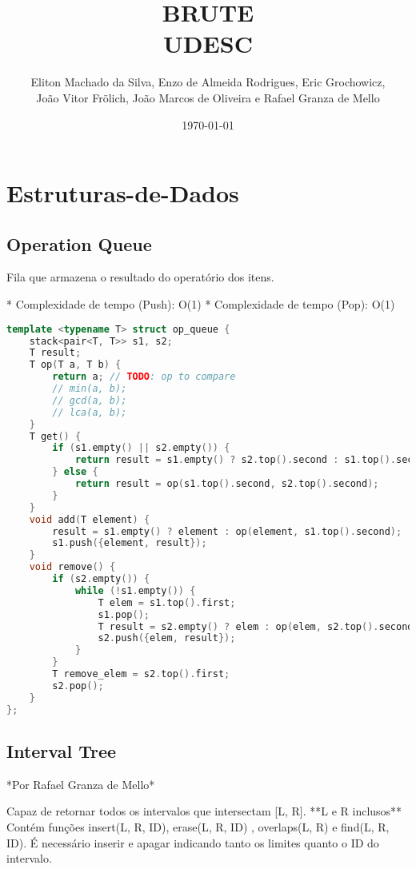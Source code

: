 \documentclass[11pt, a4paper, twoside]{article}
\title{BRUTE \\ UDESC}
\author{Eliton Machado da Silva, Enzo de Almeida Rodrigues, Eric Grochowicz, \\ João Vitor Frölich, João Marcos de Oliveira e Rafael Granza de Mello}
\begin{document}
\date{\today}
\maketitle


\renewcommand{\contentsname}{Índice} %
\tableofcontents
\newpage
%
%
%
%

\section{Estruturas-de-Dados}

\subsection{Operation Queue}



Fila que armazena o resultado do operatório dos itens.

* Complexidade de tempo (Push): O(1)
* Complexidade de tempo (Pop): O(1)

\begin{lstlisting}[language=C++]
template <typename T> struct op_queue {
    stack<pair<T, T>> s1, s2;
    T result;
    T op(T a, T b) {
        return a; // TODO: op to compare
        // min(a, b);
        // gcd(a, b);
        // lca(a, b);
    }
    T get() {
        if (s1.empty() || s2.empty()) {
            return result = s1.empty() ? s2.top().second : s1.top().second;
        } else {
            return result = op(s1.top().second, s2.top().second);
        }
    }
    void add(T element) {
        result = s1.empty() ? element : op(element, s1.top().second);
        s1.push({element, result});
    }
    void remove() {
        if (s2.empty()) {
            while (!s1.empty()) {
                T elem = s1.top().first;
                s1.pop();
                T result = s2.empty() ? elem : op(elem, s2.top().second);
                s2.push({elem, result});
            }
        }
        T remove_elem = s2.top().first;
        s2.pop();
    }
};
\end{lstlisting}


\subsection{Interval Tree}

*Por Rafael Granza de Mello*


Capaz de retornar todos os intervalos que intersectam [L, R]. **L e R inclusos**  
Contém funções insert({L, R, ID}), erase({L, R, ID}) , overlaps(L, R) e find({L, R, ID}).  
É necessário inserir e apagar indicando tanto os limites quanto o ID do intervalo.
\end{document}
